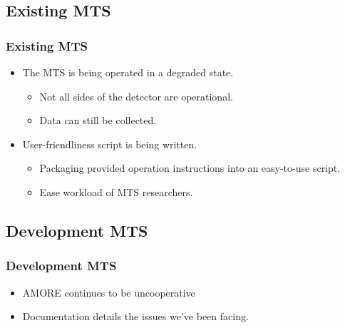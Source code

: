 \documentclass[aspectratio=169]{beamer}
\begin{document}

\subsection{Existing MTS}

\begin{frame}

  \frametitle{Existing MTS}

  \begin{itemize}
  \item The MTS is being operated in a degraded state.
    \begin{itemize}
    \item Not all sides of the detector are operational.
    \item Data can still be collected.
    \end{itemize}
  \item User-friendliness script is being written.
    \begin{itemize}
    \item Packaging provided operation instructions into an easy-to-use
      script.
    \item Ease workload of MTS researchers.
    \end{itemize}
  \end{itemize}

\end{frame}



\subsection{Development MTS}

\begin{frame}

  \frametitle{Development MTS}

  \begin{itemize}
    \item AMORE continues to be uncooperative
    \item Documentation details the issues we've been facing.
  \end{itemize}

\end{frame}

\end{document}
